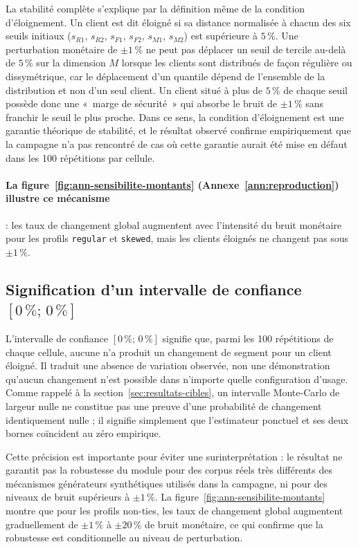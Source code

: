 La stabilité complète s'explique par la définition même de la condition d'éloignement. Un
client est dit éloigné si sa distance normalisée à chacun des six seuils initiaux ($s_{R1}$,
$s_{R2}$, $s_{F1}$, $s_{F2}$, $s_{M1}$, $s_{M2}$) est supérieure à $5\,\%$. Une
perturbation monétaire de $\pm1\,\%$ ne peut pas déplacer un seuil de tercile au-delà de
$5\,\%$ sur la dimension $M$ lorsque les clients sont distribués de façon régulière ou
dissymétrique, car le déplacement d'un quantile dépend de l'ensemble de la distribution et
non d'un seul client. Un client situé à plus de $5\,\%$ de chaque seuil possède donc une
«~marge de sécurité~» qui absorbe le bruit de $\pm1\,\%$ sans franchir le seuil le plus
proche. Dans ce sens, la condition d'éloignement est une garantie théorique de stabilité,
et le résultat observé confirme empiriquement que la campagne n'a pas rencontré de cas où
cette garantie aurait été mise en défaut dans les 100 répétitions par cellule.

\paragraph{La figure~\ref{fig:ann-sensibilite-montants} (Annexe~\ref{ann:reproduction})
illustre ce mécanisme} : les taux de changement global augmentent avec l'intensité du bruit
monétaire pour les profils \texttt{regular} et \texttt{skewed}, mais les clients éloignés
ne changent pas sous $\pm1\,\%$.

\subsection{Signification d'un intervalle de confiance $[0\,\% ;\, 0\,\%]$}
\label{subsec:disc-h2-ic}

L'intervalle de confiance $[0\,\% ;\, 0\,\%]$ signifie que, parmi les 100 répétitions de
chaque cellule, aucune n'a produit un changement de segment pour un client éloigné. Il
traduit une absence de variation observée, non une démonstration qu'aucun changement n'est
possible dans n'importe quelle configuration d'usage. Comme rappelé à la
section~\ref{sec:resultats-cibles}, un intervalle Monte-Carlo de largeur nulle ne constitue
pas une preuve d'une probabilité de changement identiquement nulle ; il signifie simplement
que l'estimateur ponctuel et ses deux bornes coïncident au zéro empirique.

Cette précision est importante pour éviter une surinterprétation : le résultat ne garantit
pas la robustesse du module pour des corpus réels très différents des mécanismes générateurs
synthétiques utilisés dans la campagne, ni pour des niveaux de bruit supérieurs à $\pm1\,\%$.
La figure~\ref{fig:ann-sensibilite-montants} montre que pour les profils non-ties, les taux
de changement global augmentent graduellement de $\pm1\,\%$ à $\pm20\,\%$ de bruit monétaire,
ce qui confirme que la robustesse est conditionnelle au niveau de perturbation.

